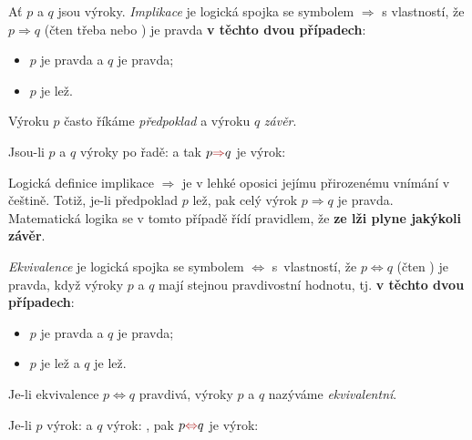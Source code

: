 \begin{definition}[Implikace]
  \label{def:implikace}
  Ať $p$ a $q$ jsou výroky. \emph{Implikace} je logická spojka se symbolem $
  \Rightarrow $ s vlastností, že $p \Rightarrow q$ (čten třeba  nebo ) je pravda \textbf{v těchto dvou případech}:
  \begin{itemize}
    \item $p$ je pravda a $q$ je pravda;
    \item $p$ je lež.
  \end{itemize}
  Výroku $p$ často říkáme \emph{předpoklad} a výroku $q$ \emph{závěr}.
\end{definition}
\begin{example}
  \label{exam:implikace}
  Jsou-li $p$ a $q$ výroky po řadě:  a  tak $p
  \clr{ \Rightarrow } q$ je výrok: 
\end{example}
\begin{warning}
  Logická definice implikace $ \Rightarrow $ je v lehké oposici jejímu
  přirozenému vnímání v češtině. Totiž, je-li předpoklad $p$ lež, pak celý výrok
  $p \Rightarrow q$ je pravda. Matematická logika se v tomto případě řídí
  pravidlem, že \textbf{ze lži plyne jakýkoli závěr}.
\end{warning}
\lessboxspace
\begin{definition}[Ekvivalence]
  \label{def:ekvivalence}
  \emph{Ekvivalence} je logická spojka se symbolem $ \Leftrightarrow $
  s~vlastností, že $p \Leftrightarrow q$ (čten )
  je pravda, když výroky $p$ a $q$ mají stejnou pravdivostní hodnotu, tj.
  \textbf{v těchto dvou případech}:
  \begin{itemize}
    \item $p$ je pravda a $q$ je
      pravda;
    \item $p$ je lež a $q$ je lež.
  \end{itemize} Je-li ekvivalence $p
  \Leftrightarrow q$ pravdivá, výroky $p$ a $q$ nazýváme \emph{ekvivalentní}.
\end{definition}
\begin{example}
  \label{exam:ekvivalence}
  Je-li $p$ výrok:  a $q$ výrok: , pak $p \clr{ \Leftrightarrow } q$ je výrok: 
\end{example}

